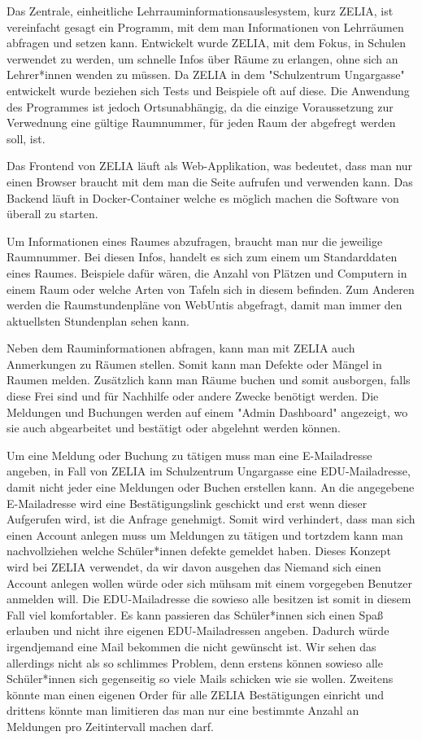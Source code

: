 

Das Zentrale, einheitliche Lehrrauminformationsauslesystem, kurz ZELIA, ist vereinfacht gesagt ein Programm, mit dem man Informationen von Lehrräumen abfragen und setzen kann. Entwickelt wurde ZELIA, mit dem Fokus, in Schulen verwendet zu werden, um schnelle Infos über Räume zu erlangen, ohne sich an Lehrer*innen wenden zu müssen. Da ZELIA in dem "Schulzentrum Ungargasse" entwickelt wurde beziehen sich Tests und Beispiele oft auf diese. Die Anwendung des Programmes ist jedoch Ortsunabhängig, da die einzige Voraussetzung zur Verwednung eine gültige Raumnummer, für jeden Raum der abgefregt werden soll, ist. 

Das Frontend von ZELIA läuft als Web-Applikation, was bedeutet, dass man nur einen Browser braucht mit dem man die Seite aufrufen und verwenden kann. Das Backend läuft in Docker-Container welche es möglich machen die Software von überall zu starten.

Um Informationen eines Raumes abzufragen, braucht man nur die jeweilige Raumnummer. Bei diesen Infos, handelt es sich zum einem um Standarddaten eines Raumes. Beispiele dafür wären, die Anzahl von Plätzen und Computern in einem Raum oder welche Arten von Tafeln sich in diesem befinden. Zum Anderen werden die Raumstundenpläne von WebUntis abgefragt, damit man immer den aktuellsten Stundenplan sehen kann.

Neben dem Rauminformationen abfragen, kann man mit ZELIA auch Anmerkungen zu Räumen stellen. Somit kann man Defekte oder Mängel in Raumen melden. Zusätzlich kann man Räume buchen und somit ausborgen, falls diese Frei sind und für Nachhilfe oder andere Zwecke benötigt werden. Die Meldungen und Buchungen werden auf einem "Admin Dashboard" angezeigt, wo sie auch abgearbeitet und bestätigt oder abgelehnt werden können. 

Um eine Meldung oder Buchung zu tätigen muss man eine E-Mailadresse angeben, in Fall von ZELIA im Schulzentrum Ungargasse eine EDU-Mailadresse, damit nicht jeder eine Meldungen oder Buchen erstellen kann. An die angegebene E-Mailadresse wird eine Bestätigungslink geschickt und erst wenn dieser Aufgerufen wird, ist die Anfrage genehmigt. Somit wird verhindert, dass man sich einen Account anlegen muss um Meldungen zu tätigen und tortzdem kann man nachvollziehen welche Schüler*innen defekte gemeldet haben. Dieses Konzept wird bei ZELIA verwendet, da wir davon ausgehen das Niemand sich einen Account anlegen wollen würde oder sich mühsam mit einem vorgegeben Benutzer anmelden will. Die EDU-Mailadresse die sowieso alle besitzen ist somit in diesem Fall viel komfortabler. Es kann passieren das Schüler*innen sich einen Spaß erlauben und nicht ihre eigenen EDU-Mailadressen angeben. Dadurch würde irgendjemand eine Mail bekommen die nicht gewünscht ist. Wir sehen das allerdings nicht als so schlimmes Problem, denn erstens können sowieso alle Schüler*innen sich gegenseitig so viele Mails schicken wie sie wollen. Zweitens könnte man einen eigenen Order für alle ZELIA Bestätigungen einricht und drittens könnte man limitieren das man nur eine bestimmte Anzahl an Meldungen pro Zeitintervall machen darf.

